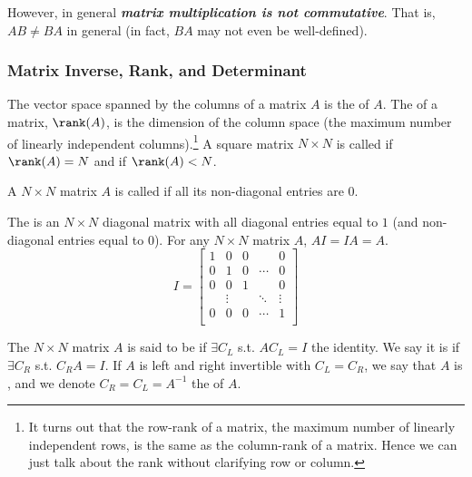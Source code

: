 \documentclass{article}
\begin{document}
However, in general \textbf{\textit{matrix multiplication is not commutative}}. That is, $AB \ne BA$ in general (in fact, $BA$ may not even be well-defined).

\subsubsection{Matrix Inverse, Rank, and Determinant}
\label{ssub:matrix_inverse_rank_and_determinant}

\begin{definition}
  The vector space spanned by the columns of a matrix $A$ is the  of $A$. The  of a matrix, $\rank(A)$, is the dimension of the column space (the maximum number of linearly independent columns).\footnote{It turns out that the row-rank of a matrix, the maximum number of linearly independent rows, is the same as the column-rank of a matrix. Hence  we can just  talk about the rank without clarifying row or column.} A square matrix $N \times N$ is called  if $\rank(A) = N$ and  if $\rank(A) < N$.
\end{definition}

\begin{definition}
  A $N \times N$ matrix $A$ is called  if all its non-diagonal entries are $0$.
\end{definition}

\begin{definition}
  The  is an $N \times N$ diagonal matrix with all diagonal entries equal to $1$ (and non-diagonal entries equal to $0$). For any $N \times N$ matrix $A$, $AI = IA = A$.
  \[
    I = \left[\begin{matrix}
        1    & 0      & 0 &        & 0      \\
        0    & 1      & 0 & \cdots & 0      \\
        0    & 0      & 1 &        & 0      \\
             & \vdots &   & \ddots & \vdots \\
        0    & 0      & 0 & \cdots & 1      \\
    \end{matrix}\right]
  \]
\end{definition}

\begin{definition}
  The $N \times N$ matrix $A$ is said to be  if $\exists C_L$ s.t. $AC_L = I$ the identity. We say it is  if $\exists C_R$ s.t. $C_RA = I$. If $A$ is left and right invertible with $C_L = C_R$, we say that $A$ is , and we denote $C_R = C_L = A^{-1}$ the  of $A$.
\end{definition}
\end{document}
